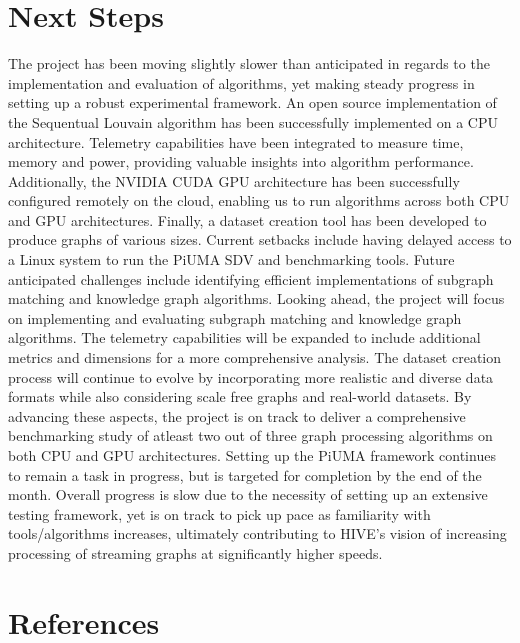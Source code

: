 \documentclass[letterpaper, 10pt]{article}
\begin{document}
\begin{multicols}{2}
    \section{Next Steps}
        The project has been moving slightly slower than anticipated in regards to the implementation and evaluation of algorithms, yet making steady progress in setting up a robust experimental framework. An open source implementation of the Sequentual Louvain algorithm has been successfully implemented on a CPU architecture. Telemetry capabilities have been integrated to measure time, memory and power, providing valuable insights into algorithm performance. Additionally, the NVIDIA CUDA GPU architecture has been successfully configured remotely on the cloud, enabling us to run algorithms across both CPU and GPU architectures. Finally, a dataset creation tool has been developed to produce graphs of various sizes. Current setbacks include having delayed access to a Linux system to run the PiUMA SDV and benchmarking tools. Future anticipated challenges include identifying efficient implementations of subgraph matching and knowledge graph algorithms. Looking ahead, the project will focus on implementing and evaluating subgraph matching and knowledge graph algorithms. The telemetry capabilities will be expanded to include additional metrics and dimensions for a more comprehensive analysis. The dataset creation process will continue to evolve by incorporating more realistic and diverse data formats while also considering scale free graphs and real-world datasets. By advancing these aspects, the project is on track to deliver a comprehensive benchmarking study of atleast two out of three graph processing algorithms on both CPU and GPU architectures. Setting up the PiUMA framework continues to remain a task in progress, but is targeted for completion by the end of the month. Overall progress is slow due to the necessity of setting up an extensive testing framework, yet is on track to pick up pace as familiarity with tools/algorithms increases, ultimately contributing to HIVE's vision of increasing processing of streaming graphs at significantly higher speeds. 
    \section{References}
        \printbibliography[heading=none]


\end{multicols}
\end{document}
